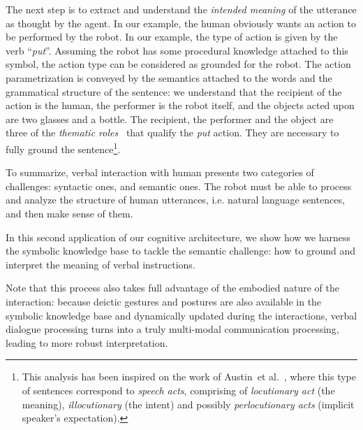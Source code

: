 \documentclass{svmult}
\newcommand{\ie}{i.e.\xspace}
\newcommand{\etal}{et al.\xspace}
\begin{document}
The next step is to extract and understand the \emph{intended meaning} of the
utterance as thought by the agent. In our example, the human obviously wants an
action to be performed by the robot. In our example, the type of action is
given by the verb ``\textit{put}''. Assuming the robot has some procedural
knowledge attached to this symbol, the action type can be considered as
grounded for the robot. The action parametrization is conveyed by the semantics
attached to the words and the grammatical structure of the sentence: we
understand that the recipient of the action is the human, the performer is the
robot itself, and the objects acted upon are two glasses and a bottle. The
recipient, the performer and the object are three of the \emph{thematic
roles}~\cite{Gruber1965} that qualify the \emph{put} action. They are necessary
to fully ground the sentence\footnote{This analysis has been inspired on the
work of Austin~\etal~\cite{Austin1962}, where this type of sentences
correspond to \emph{speech acts}, comprising of \emph{locutionary act} (the
meaning), \emph{illocutionary} (the intent) and possibly \emph{perlocutionary
acts} (implicit speaker's expectation).}.

To summarize, verbal interaction with human presents two categories of challenges: syntactic
ones, and semantic ones. The robot must be able to process and analyze the
structure of human utterances, \ie natural language sentences, and then make
sense of them. 

In this second application of our cognitive architecture, we show how we
harness the symbolic knowledge base to tackle the semantic challenge: how to
ground and interpret the meaning of verbal instructions.

Note that this process also takes full advantage of the embodied nature of the
interaction: because deictic gestures and postures are also available in the
symbolic knowledge base and dynamically updated during the interactions, verbal
dialogue processing turns into a truly multi-modal communication processing,
leading to more robust interpretation.
\end{document}
